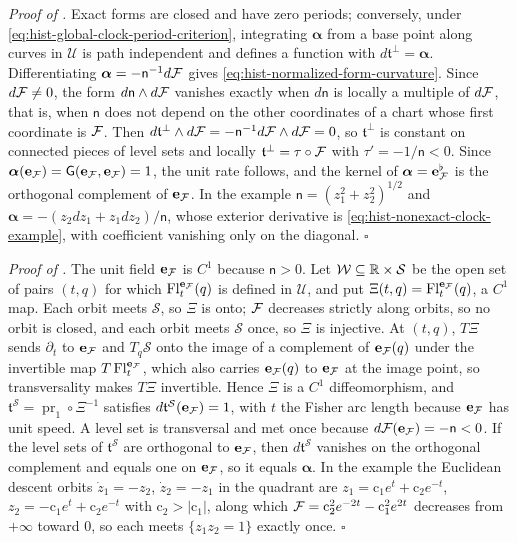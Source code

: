 \noindent\emph{Proof of .}
Exact forms are closed and have zero periods; conversely, under
\eqref{eq:hist-global-clock-period-criterion}, integrating $\bm\alpha$ from a base point
along curves in $\mathcal U$ is path independent and defines a function with
$d\mathfrak t^\perp=\bm\alpha$.  Differentiating $\bm\alpha=-\mathsf n^{-1}d\mathcal F$
gives \eqref{eq:hist-normalized-form-curvature}.  Since $d\mathcal F\ne0$, the form
$d\mathsf n\wedge d\mathcal F$ vanishes exactly when $d\mathsf n$ is locally a multiple of
$d\mathcal F$, that is, when $\mathsf n$ does not depend on the other coordinates of a chart
whose first coordinate is $\mathcal F$.  Then $d\mathfrak t^\perp\wedge
d\mathcal F=-\mathsf n^{-1}d\mathcal F\wedge d\mathcal F=0$, so $\mathfrak t^\perp$ is constant
on connected pieces of level sets and locally $\mathfrak t^\perp=\tau\circ\mathcal F$ with
$\tau'=-1/\mathsf n<0$.  Since $\bm\alpha(\mathbf e_{\mathcal F})=\mathsf G(\mathbf
e_{\mathcal F},\mathbf e_{\mathcal F})=1$, the unit rate follows, and the kernel of
$\bm\alpha=\mathbf e_{\mathcal F}^\flat$ is the orthogonal complement of
$\mathbf e_{\mathcal F}$.  In the example $\mathsf n=(z_1^2+z_2^2)^{1/2}$ and
$\bm\alpha=-(z_2dz_1+z_1dz_2)/\mathsf n$, whose exterior derivative is
\eqref{eq:hist-nonexact-clock-example}, with coefficient vanishing only on the diagonal.
$\square$

\noindent\emph{Proof of .}
The unit field $\mathbf e_{\mathcal F}$ is $C^1$ because $\mathsf n>0$.  Let
$\mathcal W\subseteq\mathbb R\times\mathcal S$ be the open set of pairs $(t,q)$ for which
$\operatorname{Fl}^{\mathbf e_{\mathcal F}}_{t}(q)$ is defined in $\mathcal U$, and put
$\Xi(t,q)=\operatorname{Fl}^{\mathbf e_{\mathcal F}}_{t}(q)$, a $C^1$ map.  Each orbit meets
$\mathcal S$, so $\Xi$ is onto; $\mathcal F$ decreases strictly along orbits, so no orbit
is closed, and each orbit meets $\mathcal S$ once, so $\Xi$ is injective.  At $(t,q)$,
$T\Xi$ sends $\partial_{t}$ to $\mathbf e_{\mathcal F}$ and $T_q\mathcal S$ onto the image
of a complement of $\mathbf e_{\mathcal F}(q)$ under the invertible map
$T\operatorname{Fl}^{\mathbf e_{\mathcal F}}_{t}$, which also carries
$\mathbf e_{\mathcal F}(q)$ to $\mathbf e_{\mathcal F}$ at the image point, so transversality
makes $T\Xi$ invertible.  Hence $\Xi$ is a $C^1$ diffeomorphism, and
$\mathfrak t^{\mathcal S}=\operatorname{pr}_1\circ\Xi^{-1}$ satisfies
$d\mathfrak t^{\mathcal S}(\mathbf e_{\mathcal F})=1$, with $t$ the Fisher arc length
because $\mathbf e_{\mathcal F}$ has unit speed.  A level set is transversal and met once
because $d\mathcal F(\mathbf e_{\mathcal F})=-\mathsf n<0$.  If the level sets of
$\mathfrak t^{\mathcal S}$ are orthogonal to $\mathbf e_{\mathcal F}$, then
$d\mathfrak t^{\mathcal S}$ vanishes on the orthogonal complement and equals one on
$\mathbf e_{\mathcal F}$, so it equals $\bm\alpha$.  In the example the Euclidean descent
orbits $\dot z_1=-z_2$, $\dot z_2=-z_1$ in the quadrant are
$z_1=\mathrm c_1e^t+\mathrm c_2e^{-t}$, $z_2=-\mathrm c_1e^t+\mathrm c_2e^{-t}$ with
$\mathrm c_2>|\mathrm c_1|$, along which $\mathcal F=\mathrm c_2^2e^{-2t}-\mathrm
c_1^2e^{2t}$ decreases from $+\infty$ toward $0$, so each meets $\{z_1z_2=1\}$ exactly
once.  $\square$

